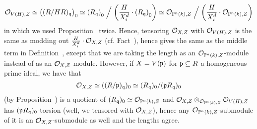 \documentclass[a4paper,parskip=half,numbers=enddot, DIV=12, headheight=30pt]{scrreprt}
\begin{document}
\begin{rem}
\begin{alphanumerate}
        \begin{align*}
        	\mathcal{O}_{V(H),Z}\simeq\big((R/HR)_{\mathfrak{q}}\big)_0\simeq \left(R_{\mathfrak{q}}\right)_0\Bigm/\left(\frac{H}{X_i^d}\cdot \left(R_{\mathfrak{q}}\right)_0\right)\simeq \mathcal{O}_{\mathbb{P}^n(k),Z}\Bigm/\left(\frac{H}{X_i^d}\cdot \mathcal{O}_{\mathbb{P}^n(k),Z}\right)
        \end{align*}
        in which we used Proposition~ twice. Hence, tensoring $\mathcal{O}_{X,Z}$ with $\mathcal{O}_{V(H),Z}$ is the same as modding out $\frac{H}{X_i^d}\cdot \mathcal{O}_{X,Z}$ (cf. Fact~), hence gives the same as the middle term in Definition~, except that we are taking the length as an $\mathcal{O}_{\mathbb{P}^n(k),Z}$-module instead of as an $\mathcal{O}_{X,Z}$-module. However, if $X=V(\mathfrak{p})$ for $\mathfrak{p}\subseteq R$ a homogeneous prime ideal, we have that
        \begin{align*}
        	\mathcal{O}_{X,Z}\simeq ((R/\mathfrak{p})_{\mathfrak{q}})_0\simeq (R_{\mathfrak{q}})_0/(\mathfrak{p} R_{\mathfrak{q}})_0
        \end{align*}
        (by Proposition~) is a quotient of $(R_{\mathfrak{q}})_0\simeq\mathcal{O}_{\mathbb{P}^n(k),Z}$ and $\mathcal{O}_{X,Z}\otimes_{\mathcal{O}_{\mathbb{P}^n(k), Z}} \mathcal{O}_{V(H),Z}$ has $(\mathfrak{p} R_{\mathfrak{q}})_0$-torsion (well, we tensored with $\mathcal{O}_{X,Z}$), hence any $\mathcal{O}_{\mathbb{P}^n(k),Z}$-submodule of it is an $\mathcal{O}_{X,Z}$-submodule as well and the lengths agree.
    \end{alphanumerate}
\end{rem}
\end{document}
